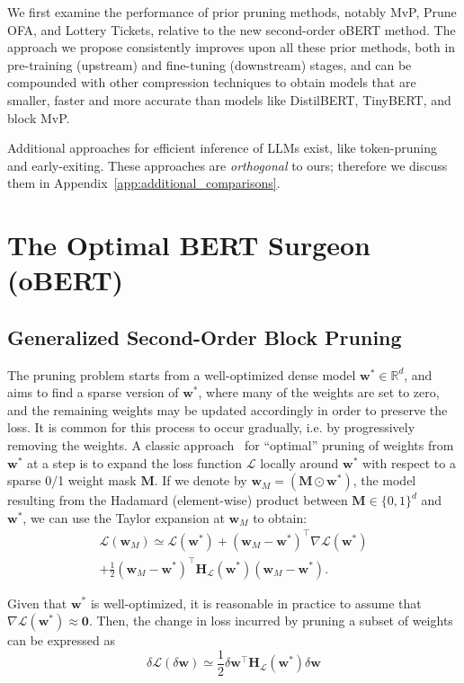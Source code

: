 \documentclass[11pt]{article}
\newcommand{\vect}[1]{\mathbf{#1}}
\newcommand{\wm}{\vect{w}_M}
\newcommand{\ws}{\vect{w}^*}
\newcommand{\w}{\mathbf{w}}
\newcommand{\hess}{\vect{H_{\mathcal{L}}}}
\newcommand{\dw}{\delta \w}
\newcommand{\dL}{\delta \mathcal{L}}
\begin{document}
We first examine the performance of prior pruning methods, notably MvP, Prune OFA, and Lottery Tickets, relative to the new second-order oBERT method. The approach we propose consistently improves upon all these prior methods, both in pre-training (upstream) and fine-tuning (downstream) stages, and can be compounded with other compression techniques to obtain models that are smaller, faster and more accurate than models like DistilBERT, TinyBERT, and block MvP. 

Additional approaches for efficient inference of LLMs exist, like token-pruning and early-exiting. These approaches are \emph{orthogonal} to ours; therefore we discuss them in Appendix~\ref{app:additional_comparisons}.

\section{The Optimal BERT Surgeon (oBERT)}
\label{sec:obs}

\subsection{Generalized Second-Order Block Pruning}

The pruning problem starts from a well-optimized dense model \( \ws \in \mathbb{R}^d \), and aims to find a sparse version of $\ws$, where many of the weights are set to zero, 
and the remaining weights may be updated accordingly in order to preserve the loss. 
It is common for this process to occur gradually, i.e. by progressively removing the weights. 
A classic approach~\cite{LeCun1989OptimalBD, hassibi1993second}  for ``optimal'' pruning of weights from $\ws$ at a step is to expand the loss function $\mathcal{L}$ locally around $\ws$ with respect to a sparse 0/1 weight mask $\vect{M}$. If we denote by $\w_M = (\vect{M} \odot \ws)$, the model resulting from the Hadamard (element-wise) product between \( \vect{M} \in \{0,1\}^d \) and $\ws$, we can use the Taylor expansion at $\w_M$ to obtain: 
\begin{eqnarray*}
    \mathcal{L}(\wm) \simeq \mathcal{L}(\ws) + (\wm - \ws)^\top \nabla \mathcal{L}(\ws) \\ + \frac{1}{2} (\wm - \ws)^\top \hess (\ws) (\wm - \ws). 
\end{eqnarray*}

\noindent Given that $\ws$ is well-optimized, it is reasonable in practice to assume that \( \nabla \mathcal{L}(\ws) \approx \vect{0} \).
Then, the change in loss incurred by pruning a subset of weights can be expressed as
\begin{equation}
\label{eq:delta-loss}
    \dL (\dw) \simeq \frac{1}{2} \dw^\top \hess (\ws) \dw 
\end{equation}
\end{document}
